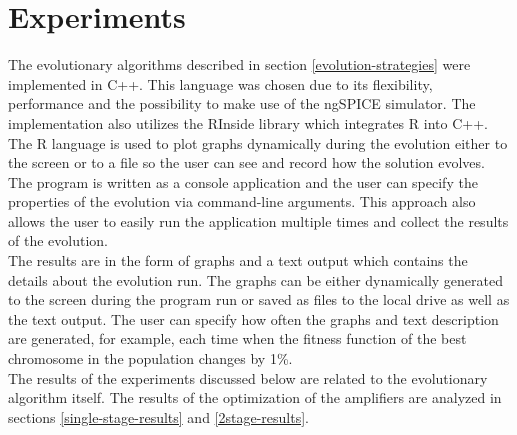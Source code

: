 \chapter{Experiments}
The evolutionary algorithms described in section \ref{evolution-strategies} were implemented in C++. This language was chosen due to its flexibility, performance and the possibility to make use of the ngSPICE simulator. The implementation also utilizes the RInside library which integrates R into C++. The R language is used to plot graphs dynamically during the evolution either to the screen or to a file so the user can see and record how the solution evolves.\\
The program is written as a console application and the user can specify the properties of the evolution via command-line arguments. This approach also allows the user to easily run the application multiple times and collect the results of the evolution.\\
The results are in the form of graphs and a text output which contains the details about the evolution run. The graphs can be either dynamically generated to the screen during the program run or saved as files to the local drive as well as the text output. The user can specify how often the graphs and text description are generated, for example, each time when the fitness function of the best chromosome in the population changes by 1\%.\\
The results of the experiments discussed below are related to the evolutionary algorithm itself. The results of the optimization of the amplifiers are analyzed in sections \ref{single-stage-results} and \ref{2stage-results}.

